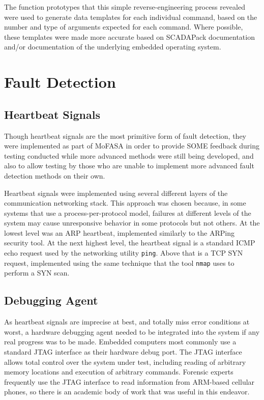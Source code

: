 \documentclass{report}
\begin{document}
The function prototypes that this simple reverse-engineering process revealed were used to generate data templates for each individual command, based on 
the number and type of arguments expected for each command. Where possible, these templates were made more accurate based on SCADAPack documentation and/or
documentation of the underlying embedded operating system.

\section{Fault Detection}

\subsection{Heartbeat Signals}

Though heartbeat signals are the most primitive form of fault detection, they were implemented as part of MoFASA in order to provide SOME feedback during
testing conducted while more advanced methods were still being developed, and also to allow testing by those who are unable to implement more advanced
fault detection methods on their own.

Heartbeat signals were implemented using several different layers of the communication networking stack. This approach was chosen because, in some systems that
use a process-per-protocol model, failures at different levels of the system may cause unresponsive behavior in some protocols but not others. At the lowest level 
was an ARP heartbeat, implemented similarly to the ARPing security tool. At the next highest level, the heartbeat signal is a standard ICMP echo request used by
the networking utility \texttt{ping}. Above that is a TCP SYN request, implemented using the same technique that the tool \texttt{nmap} uses to perform a SYN scan.

\subsection{Debugging Agent}

As heartbeat signals are imprecise at best, and totally miss error conditions at worst, a hardware debugging agent needed to be integrated into the system if any real
progress was to be made. Embedded computers most commonly use a standard JTAG interface as their hardware debug port. The JTAG interface allows total control over the
system under test, including reading of arbitrary memory locations and execution of arbitrary commands. Forensic experts frequently use the JTAG interface to
read information from ARM-based cellular phones, so there is an academic body of work that was useful in this endeavor.
\end{document}
